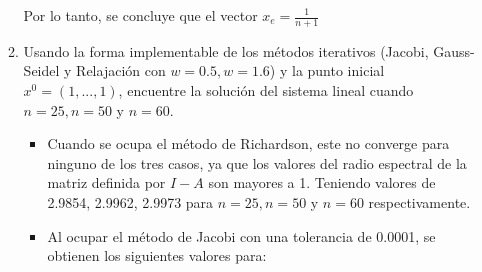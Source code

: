 \documentclass{udpreport}
\begin{document}
\begin{enumerate}
\begin{enumerate}
			Por lo tanto, se concluye que el vector $x_{e} = \frac{1}{n+1}$
			
			\item Usando la forma implementable de los métodos iterativos (Jacobi, Gauss-Seidel y Relajación con $w = 0.5, w = 1.6$) y la punto inicial $x^0 = (1, . . . , 1)$, encuentre la solución del sistema lineal cuando $n = 25, n = 50 $ y $ n = 60$.	
			\begin{itemize}
				\item Cuando se ocupa el método de Richardson, este no converge para ninguno de los tres casos, ya que los valores del radio espectral de la matriz definida por $I-A$ son mayores a 1. Teniendo valores de 2.9854, 2.9962, 2.9973 para $n=25, n=50$ y $n=60$ respectivamente.
				
				\item Al ocupar el método de Jacobi con una tolerancia de 0.0001, se obtienen los siguientes valores para:
				

\end{itemize}
\end{enumerate}
\end{enumerate}
\end{document}

